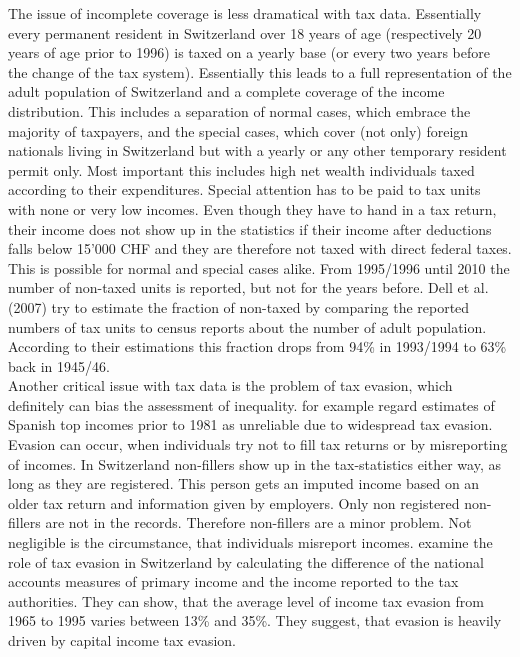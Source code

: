 \documentclass[twoside]{article}\usepackage[]{graphicx}\usepackage[]{color}
\begin{document}
\begin{multicols}{2}
The issue of incomplete coverage is less dramatical with tax data. Essentially every permanent resident in Switzerland over 18 years of age (respectively 20 years of age prior to 1996) is taxed on a yearly base (or every two years before the change of the tax system). Essentially this leads to a full representation of the adult population of Switzerland and a complete coverage of the income distribution. This includes a separation of normal cases, which embrace the majority of taxpayers, and the special cases, which cover (not only) foreign nationals living in Switzerland but with a yearly or any other temporary resident permit only. Most important this includes high net wealth individuals taxed according to their expenditures. Special attention has to be paid to tax units with none or very low incomes. Even though they have to hand in a tax return, their income does not show up in the statistics if their income after deductions falls below 15'000 CHF and they are therefore not taxed with direct federal taxes. This is possible for normal and special cases alike. From 1995/1996 until 2010 the number of non-taxed units is reported, but not for the years before. Dell et al. (2007) try to estimate the fraction of non-taxed by comparing the reported numbers of tax units to census reports about the number of adult population. According to their estimations this fraction drops from 94\% in 1993/1994 to 63\% back in 1945/46. \\

Another critical issue with tax data is the problem of tax evasion, which definitely can bias the assessment of inequality. \citet{alvaredo_income_2009} for example regard estimates of Spanish top incomes prior to 1981 as unreliable due to widespread tax evasion. Evasion can occur, when individuals try not to fill tax returns or by misreporting of incomes. In Switzerland non-fillers show up in the tax-statistics either way, as long as they are registered. This person gets an imputed income based on an older tax return and information given by employers. Only non registered non-fillers are not in the records. Therefore non-fillers are a minor problem. Not negligible is the circumstance, that individuals misreport incomes. \citet{feld_tax_2006} examine the role of tax evasion in Switzerland by calculating the difference of the national accounts measures of primary income and the income reported to the tax authorities. They can show, that the average level of income tax evasion from 1965 to 1995 varies between 13\% and 35\%. They suggest, that evasion is heavily driven by capital income tax evasion. \\







\end{multicols}
\end{document}

